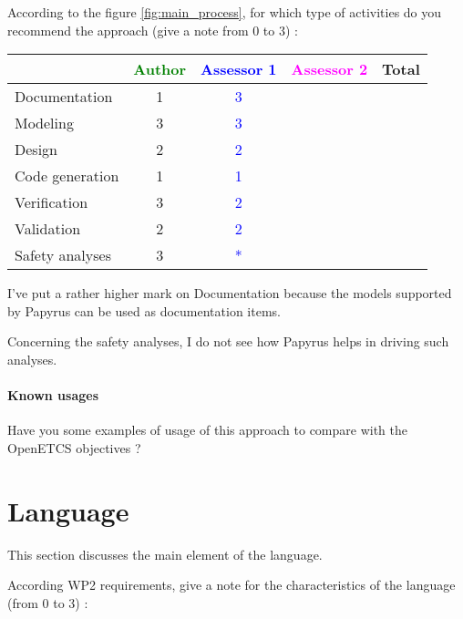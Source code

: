 According to the figure \ref{fig:main_process}, for which type of activities do you recommend the approach (give a note from 0 to 3) :

\begin{tabular}{|l | c | c | c | c|}
\hline
& \textcolor{green}{Author} & \textcolor{blue}{Assessor 1} & \textcolor{magenta}{Assessor 2} & Total \\
\hline
Documentation & 1 & \textcolor{blue}{3} & & \\
\hline
Modeling & 3 &  \textcolor{blue}{3} & & \\
\hline
Design & 2 &  \textcolor{blue}{2} & & \\
\hline
Code generation & 1 &  \textcolor{blue}{1} & & \\
\hline
Verification & 3 &  \textcolor{blue}{2} & & \\
\hline
Validation & 2 &  \textcolor{blue}{2} & & \\
\hline
Safety analyses & 3 & \textcolor{blue}{*} & & \\
\hline
\end{tabular}

\begin{assessor1}
I've put a rather higher mark on Documentation because the models supported by Papyrus can be used as documentation items. 

Concerning the safety analyses, I do not see how Papyrus helps in driving such analyses. 
\end{assessor1}

\paragraph{Known usages} Have you some examples of usage of this approach to compare with the OpenETCS objectives ?

\section{Language}
This section discusses the main element of the language.

According WP2 requirements, give a note for the characteristics of the language (from 0 to 3) :

